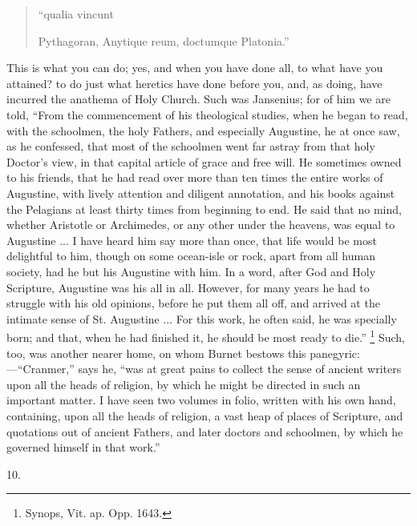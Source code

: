 \begin{quote}

``qualia vincunt

Pythagoran, Anytique reum, doctumque Platonia.''

\end{quote}

This is what you can do; yes, and when you have done all, to what
have you attained? to do just what heretics have done before you, and,
as doing, have incurred the anathema of Holy Church. Such was
Jansenius; for of him we are told, ``From the commencement of his
theological studies, when he began to read, with the schoolmen, the
holy Fathers, and especially Augustine, he at once saw, as he
confessed, that most of the schoolmen went far astray from that holy
Doctor's view, in that capital article of grace and free will. He
sometimes owned to his friends, that he had read over more than ten
times the entire works of Augustine, with lively attention and
diligent annotation, and his books against the Pelagians at least
thirty times from beginning to end. He said that no mind, whether
Aristotle or Archimedes, or any other under the heavens, was equal to
Augustine ... I have heard him say more than once, that life would be
most delightful to him, though on some ocean-isle or rock, apart from
all human society, had he but his Augustine with him. In a word, after
God and Holy Scripture, Augustine was his all in all. However, for
many years he had to struggle with his old opinions, before he put
them all off, and arrived at the intimate sense of St. Augustine ...
For this work, he often said, he was specially born; and that, when he
had finished it, he should be most ready to die.'' \footnote{Synops, Vit. ap. Opp. 1643.} Such, too, was another nearer home, on whom Burnet bestows
this panegyric:—``Cranmer,'' says he, ``was at great
pains to collect the sense of ancient writers upon all the heads of
religion, by which he might be directed in such an important matter. I
have seen two volumes in folio, written with his own hand, containing,
upon all the heads of religion, a vast heap of places of Scripture,
and quotations out of ancient Fathers, and later doctors and
schoolmen, by which he governed himself in that work.''

10.

